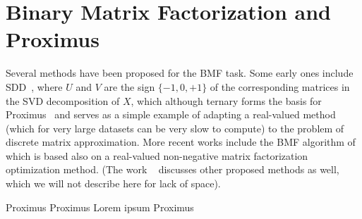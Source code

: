 \documentclass[a4paper]{IEEEtran}
\begin{document}
\section{Binary Matrix Factorization and Proximus}

Several methods have been proposed for the BMF task. Some early ones include SDD~\cite{sdd}, where $U$ and $V$ are the sign $\{-1,0,+1\}$ of the corresponding matrices in the SVD decomposition of $X$, which although ternary forms the basis for Proximus~\cite{proximus} and serves as a simple example of adapting a real-valued method (which for very large datasets can be very slow to compute) to the problem of discrete matrix approximation.
More recent works include the BMF algorithm of~\cite{zhang07} which is based also on a real-valued non-negative matrix factorization optimization method.
(The work ~\cite{zhang07} discusses other proposed methods as well, which we will not describe here for lack of space). %

Proximus
Proximus
Lorem ipsum Proximus

%
%
%
%
\end{document}
